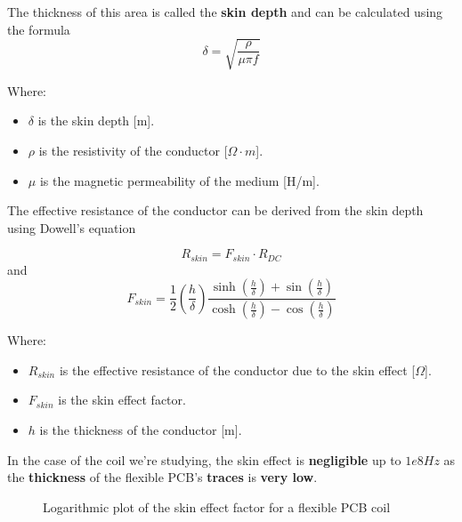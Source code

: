 \begin{itemize}
    The thickness of this area is called the \textbf{skin depth} and can be calculated using the formula
    \begin{equation*}
        \delta = \sqrt{\frac{\rho}{\mu \pi f}}
    \end{equation*}
            
    Where:
    \begin{itemize}
        \item \( \delta \) is the skin depth [m].
        \item \( \rho \) is the resistivity of the conductor [\(\Omega \cdot m\)].
        \item \( \mu \) is the magnetic permeability of the medium [H/m].
    \end{itemize}
    
    \begin{samepage}
        The effective resistance of the conductor can be derived from the skin depth using Dowell's equation \cite{AC_res_coils}
        \nopagebreak

        \begin{equation*}
            R_{skin} = F_{skin} \cdot R_{DC}
        \end{equation*}
        and
        \begin{equation*}
            F_{skin} = \frac{1}{2} (\frac{h}{\delta}) \frac{\sinh(\frac{h}{\delta}) + \sin(\frac{h}{\delta})}{\cosh(\frac{h}{\delta}) - \cos(\frac{h}{\delta})}
        \end{equation*}

        Where:
        \begin{itemize}
            \item \( R_{skin} \) is the effective resistance of the conductor due to the skin effect [\(\Omega\)].
            \item \( F_{skin} \) is the skin effect factor.
            \item \( h \) is the thickness of the conductor [m].
        \end{itemize}
    \end{samepage}

    \begin{samepage}
        In the case of the coil we're studying, the skin effect is \textbf{negligible} up to $1e8 Hz$ as the \textbf{thickness} of the flexible PCB's \textbf{traces} is \textbf{very low}.
        \nopagebreak

        \begin{figure}[H]
            \centering
            
            \caption[Fskin of Flexar]{Logarithmic plot of the skin effect factor for a flexible PCB coil}
            \label{fig:Fskin of Flexar}
        \end{figure}
        \nopagebreak
    

\end{samepage}
\end{itemize}
